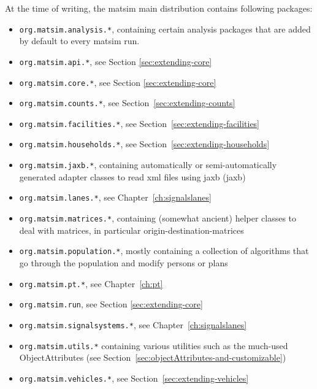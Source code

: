 At the time of writing, the \gls{matsim} main distribution contains following packages:
\begin{itemize}\styleItemize
\item \lstinline{org.matsim.analysis.*}, containing certain analysis packages that are added by default to every \gls{matsim} run.
\item \lstinline{org.matsim.api.*}, see Section \ref{sec:extending-core}
\item \lstinline{org.matsim.core.*}, see Section \ref{sec:extending-core}
\item \lstinline{org.matsim.counts.*}, see Section~\ref{sec:extending-counts}
\item \lstinline{org.matsim.facilities.*}, see Section~\ref{sec:extending-facilities}
\item \lstinline{org.matsim.households.*}, see Section~\ref{sec:extending-households}
\item \lstinline{org.matsim.jaxb.*}, containing automatically or semi-automatically generated adapter classes to read \gls{xml} files using \acrshort{jaxb} (\acrlong{jaxb})
\item \lstinline{org.matsim.lanes.*}, see Chapter~\ref{ch:signalslanes}
\item \lstinline{org.matsim.matrices.*}, containing  (somewhat ancient) helper classes to deal with matrices, in particular origin-destination-matrices
\item \lstinline{org.matsim.population.*}, mostly containing a collection of algorithms that go through the population and modify persons or plans
\item \lstinline{org.matsim.pt.*}, see Chapter~\ref{ch:pt}
\item \lstinline{org.matsim.run}, see Section \ref{sec:extending-core}
\item \lstinline{org.matsim.signalsystems.*}, see Chapter~\ref{ch:signalslanes}
\item \lstinline{org.matsim.utils.*} containing various utilities such as the much-used ObjectAttributes
(see Section~\ref{sec:objectAttributes-and-customizable})
\item \lstinline{org.matsim.vehicles.*}, see Section~\ref{sec:extending-vehicles}

\end{itemize}
